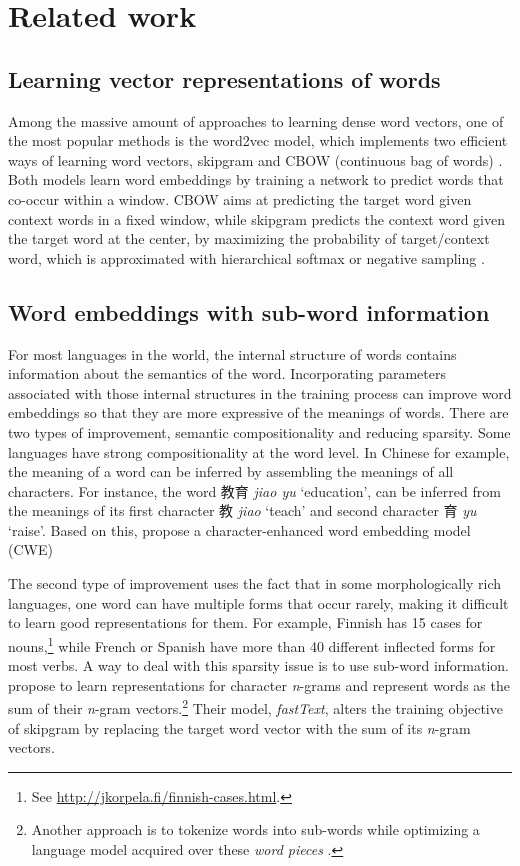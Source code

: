 \documentclass[output=paper]{langsci/langscibook}
\begin{document}
\section{Related work}
\subsection{Learning vector representations of words}
Among the massive amount of approaches to learning dense word vectors, one of the most popular methods is the word2vec model, which implements two efficient ways of learning word vectors, skipgram and CBOW (continuous bag of words) \citep{mikolov2013-distributed,mikolov2013efficient}. Both models learn word embeddings by training a network to predict words that co-occur within a window. 
CBOW aims at predicting  the target word given context words in a fixed window, while skipgram predicts the context word given the target word at the center, by maximizing the probability of target/context word, which is approximated with hierarchical softmax or negative sampling \citep{mikolov2013-distributed,mikolov2013efficient}.


\subsection{Word embeddings with sub-word information}\label{sec:improve_sub-word}
For most languages in the world, the internal structure of words contains information about the semantics of the word. 
Incorporating parameters associated with those internal structures in the training process can improve word embeddings so that they are more expressive of the meanings of words. 
There are two types of improvement, semantic compositionality and reducing sparsity. Some languages have strong compositionality at the word level. In Chinese for example, the meaning of a word can be inferred by assembling the meanings of all characters. For instance, the word {\cjkfont 教育} \textit{jiao yu} `education', can be inferred from the meanings of its first character {\cjkfont 教} \textit{jiao} `teach' and second character {\cjkfont 育} \textit{yu} `raise'. 
Based on this, \citet{chen2015joint} propose a character-enhanced word embedding model (CWE) 

The second type of improvement uses the fact that in some morphologically rich languages, one word can have multiple forms that occur rarely, making it difficult to learn good representations for them. 
For example, Finnish has 15 cases for nouns,\footnote{See \url{http://jkorpela.fi/finnish-cases.html}.} while French or Spanish have more than 40 different inflected forms for most verbs. 
A way to deal with this sparsity issue is to use sub-word information. \citet{bojanowski2017enriching} propose to learn representations for character \emph{n}-grams and represent words as the sum of their \emph{n}-gram vectors.\footnote{Another approach is to tokenize words into sub-words while optimizing a language model acquired over these \emph{word pieces} \citep{schuster2012japanese,sennrich2015neural}.}
Their model, \emph{fastText}, alters the training objective of skipgram by replacing the target word vector with the sum of its \emph{n}-gram vectors. 
\end{document}
